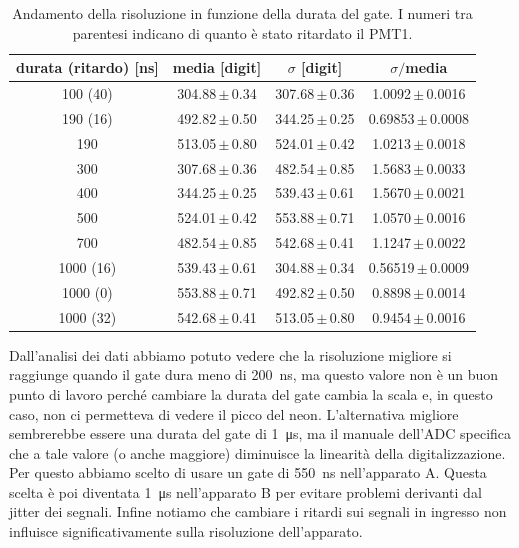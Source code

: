 \begin{table}[h]
\centering
\begin{tabular}{c|c|c|c}
durata (ritardo) [ns] & media [digit] & $\sigma$ [digit] & $\sigma\!/$\!media\\
\hline
 100 (40) & 304.88\,$\pm$\,0.34 & 307.68\,$\pm$\,0.36 &  1.0092\,$\pm$\,0.0016 \\
 190 (16) & 492.82\,$\pm$\,0.50 & 344.25\,$\pm$\,0.25 & 0.69853\,$\pm$\,0.0008 \\
 190 & 513.05\,$\pm$\,0.80 & 524.01\,$\pm$\,0.42 &  1.0213\,$\pm$\,0.0018 \\
 300 & 307.68\,$\pm$\,0.36 & 482.54\,$\pm$\,0.85 &  1.5683\,$\pm$\,0.0033 \\
 400 & 344.25\,$\pm$\,0.25 & 539.43\,$\pm$\,0.61 &  1.5670\,$\pm$\,0.0021 \\
 500 & 524.01\,$\pm$\,0.42 & 553.88\,$\pm$\,0.71 &  1.0570\,$\pm$\,0.0016 \\
 700 & 482.54\,$\pm$\,0.85 & 542.68\,$\pm$\,0.41 &  1.1247\,$\pm$\,0.0022 \\
1000 (16) & 539.43\,$\pm$\,0.61 & 304.88\,$\pm$\,0.34 & 0.56519\,$\pm$\,0.0009 \\
1000 (0) & 553.88\,$\pm$\,0.71 & 492.82\,$\pm$\,0.50 &  0.8898\,$\pm$\,0.0014 \\
1000 (32) & 542.68\,$\pm$\,0.41 & 513.05\,$\pm$\,0.80 &  0.9454\,$\pm$\,0.0016 
\end{tabular}

\caption{Andamento della risoluzione in funzione della durata del gate. I numeri tra parentesi indicano di quanto è stato ritardato il PMT1.}
\label{tab:gate}
\end{table}

Dall'analisi dei dati abbiamo potuto vedere che la risoluzione migliore si raggiunge quando il gate dura meno di \SI{200}{ns}, ma questo valore non è un buon punto di lavoro perché cambiare la durata del gate cambia la scala e, in questo caso, non ci permetteva di vedere il picco del neon. L'alternativa migliore sembrerebbe essere una durata del gate di \SI{1}{\micro s}, ma il manuale dell'ADC specifica che a tale valore (o anche maggiore) diminuisce la linearità della digitalizzazione. Per questo abbiamo scelto di usare un gate di \SI{550}{ns} nell'apparato A. Questa scelta è poi diventata \SI{1}{\micro s} nell'apparato B per evitare problemi derivanti dal jitter dei segnali. Infine notiamo che cambiare i ritardi sui segnali in ingresso non influisce significativamente sulla risoluzione dell'apparato.